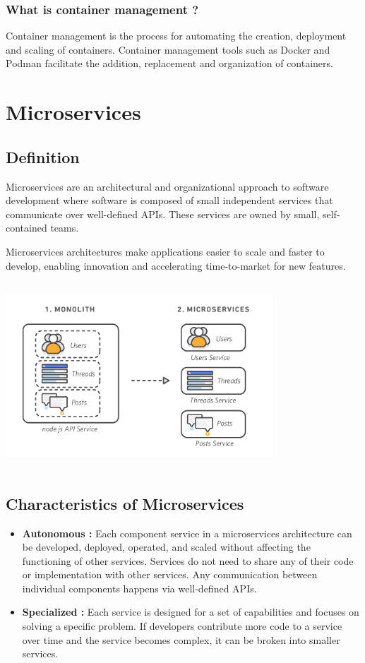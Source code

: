 \subsubsection*{What is container management ?}
Container management is the process for automating the creation, deployment and scaling of containers. Container management tools such as Docker and Podman facilitate the addition, replacement and organization of containers.

\section{Microservices}

\subsection{Definition}
Microservices are an architectural and organizational approach to software development where software is composed of small independent services that communicate over well-defined APIs. These services are owned by small, self-contained teams.

\medskip
Microservices architectures make applications easier to scale and faster to develop, enabling innovation and accelerating time-to-market for new features.
\begin{center}
	\includegraphics[width=10cm, height=7cm]{src/assets/images/microservices.png}
\end{center}
\subsection{Characteristics of Microservices}
\begin{itemize}
	\item \textbf{Autonomous :} Each component service in a microservices architecture can be developed, deployed, operated, and scaled without affecting the functioning of other services. Services do not need to share any of their code or implementation with other services. Any communication between individual components happens via well-defined APIs.
	\item \textbf{Specialized :} Each service is designed for a set of capabilities and focuses on solving a specific problem. If developers contribute more code to a service over time and the service becomes complex, it can be broken into smaller services.
\end{itemize}

